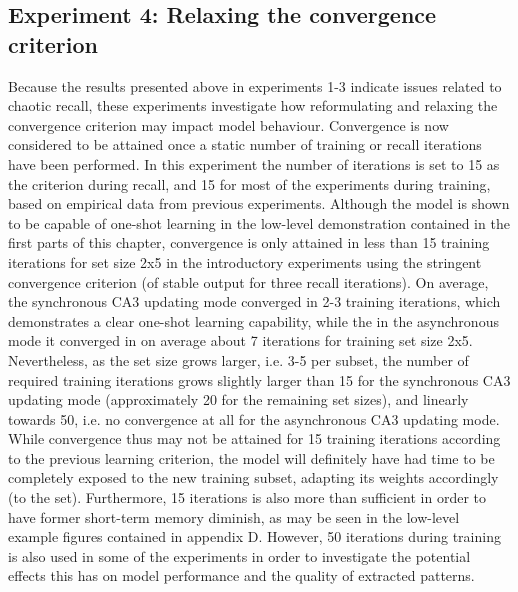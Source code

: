 \subsection{Experiment 4: Relaxing the convergence criterion}\label{sect:relaxed-criterion}

Because the results presented above in experiments 1-3 indicate issues related to chaotic recall, these experiments investigate how reformulating and relaxing the convergence criterion may impact model behaviour. Convergence is now considered to be attained once a static number of training or recall iterations have been performed. In this experiment the number of iterations is set to 15 as the criterion during recall, and 15 for most of the experiments during training, based on empirical data from previous experiments.
Although the model is shown to be capable of one-shot learning in the low-level demonstration contained in the first parts of this chapter, convergence is only attained in less than 15 training iterations for set size 2x5 in the introductory experiments using the stringent convergence criterion (of stable output for three recall iterations). On average, the synchronous CA3 updating mode converged in 2-3 training iterations, which demonstrates a clear one-shot learning capability, while the in the asynchronous mode it converged in on average about 7 iterations for training set size 2x5. 
%
Nevertheless, as the set size grows larger, i.e. 3-5 per subset, the number of required training iterations grows slightly larger than 15 for the synchronous CA3 updating mode (approximately 20 for the remaining set sizes), and linearly towards 50, i.e. no convergence at all for the asynchronous CA3 updating mode.
While convergence thus may not be attained for 15 training iterations according to the previous learning criterion, the model will definitely have had time to be completely exposed to the new training subset, adapting its weights accordingly (to the set). Furthermore, 15 iterations is also more than sufficient in order to have former short-term memory diminish, as may be seen in the low-level example figures contained in appendix D.
However, 50 iterations during training is also used in some of the experiments in order to investigate the potential effects this has on model performance and the quality of extracted patterns.

